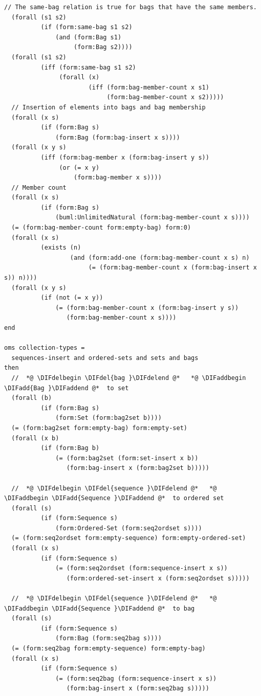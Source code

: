 \documentclass[10pt,fleqn,final]{scrreprt}
\newenvironment{definitions}[0]{\medskip }{}
\providecommand{\DIFadd}[1]{{\protect\color{blue}\uwave{#1}}} %
\providecommand{\DIFdel}[1]{{\protect\color{red}\sout{#1}}}                      %
\providecommand{\DIFaddbegin}{} %
\providecommand{\DIFaddend}{} %
\providecommand{\DIFdelbegin}{} %
\providecommand{\DIFdelend}{} %
\begin{document}
\begin{definitions}
\begin{lstlisting}[language=clif,morekeywords={then,with,logic,oms,end},mathescape]
  // The same-bag relation is true for bags that have the same members.
  (forall (s1 s2)
          (if (form:same-bag s1 s2)
              (and (form:Bag s1)
                   (form:Bag s2))))
  (forall (s1 s2)
          (iff (form:same-bag s1 s2)
               (forall (x)
                       (iff (form:bag-member-count x s1)
                            (form:bag-member-count x s2)))))
  // Insertion of elements into bags and bag membership
  (forall (x s)
          (if (form:Bag s)
              (form:Bag (form:bag-insert x s))))
  (forall (x y s)
          (iff (form:bag-member x (form:bag-insert y s))
               (or (= x y)
                   (form:bag-member x s))))
  // Member count
  (forall (x s)
          (if (form:Bag s)
              (buml:UnlimitedNatural (form:bag-member-count x s))))
  (= (form:bag-member-count form:empty-bag) form:0)
  (forall (x s)
          (exists (n)
                  (and (form:add-one (form:bag-member-count x s) n)
                       (= (form:bag-member-count x (form:bag-insert x s)) n))))
  (forall (x y s)
          (if (not (= x y))
              (= (form:bag-member-count x (form:bag-insert y s))
                 (form:bag-member-count x s))))
end

oms collection-types =
  sequences-insert and ordered-sets and sets and bags
then
  //  *@ \DIFdelbegin \DIFdel{bag }\DIFdelend @*   *@ \DIFaddbegin \DIFadd{Bag }\DIFaddend @*  to set
  (forall (b)
          (if (form:Bag s)
              (form:Set (form:bag2set b))))
  (= (form:bag2set form:empty-bag) form:empty-set)
  (forall (x b)
          (if (form:Bag b)
              (= (form:bag2set (form:set-insert x b))
                 (form:bag-insert x (form:bag2set b)))))

  //  *@ \DIFdelbegin \DIFdel{sequence }\DIFdelend @*   *@ \DIFaddbegin \DIFadd{Sequence }\DIFaddend @*  to ordered set
  (forall (s)
          (if (form:Sequence s)
              (form:Ordered-Set (form:seq2ordset s))))
  (= (form:seq2ordset form:empty-sequence) form:empty-ordered-set)
  (forall (x s)
          (if (form:Sequence s)
              (= (form:seq2ordset (form:sequence-insert x s))
                 (form:ordered-set-insert x (form:seq2ordset s)))))

  //  *@ \DIFdelbegin \DIFdel{sequence }\DIFdelend @*   *@ \DIFaddbegin \DIFadd{Sequence }\DIFaddend @*  to bag
  (forall (s)
          (if (form:Sequence s)
              (form:Bag (form:seq2bag s))))
  (= (form:seq2bag form:empty-sequence) form:empty-bag)
  (forall (x s)
          (if (form:Sequence s)
              (= (form:seq2bag (form:sequence-insert x s))
                 (form:bag-insert x (form:seq2bag s)))))


\end{lstlisting}
\end{definitions}
\end{document}
